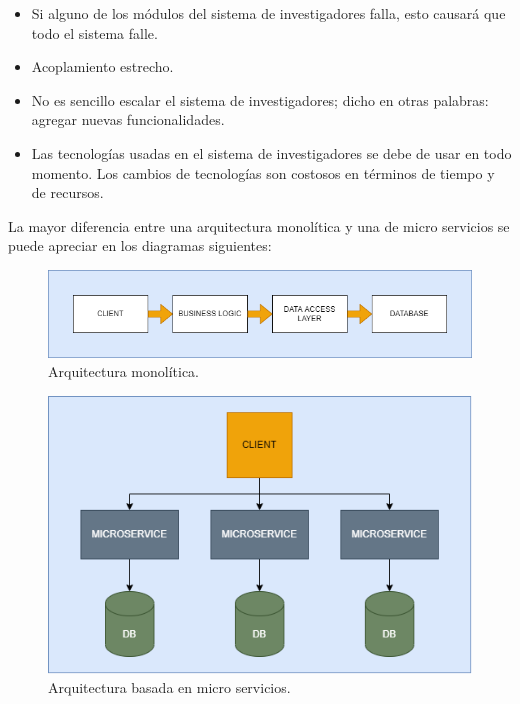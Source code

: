     \begin{itemize}
        \item Si alguno de los módulos del sistema de investigadores falla, esto causará que todo el sistema falle.
        \item Acoplamiento estrecho.
        \item No es sencillo escalar el sistema de investigadores; dicho en otras palabras: agregar nuevas funcionalidades.
        \item Las tecnologías usadas en el sistema de investigadores se debe de usar en todo momento. Los cambios de tecnologías son costosos en términos de tiempo y de recursos.
    \end{itemize}
    
    La mayor diferencia entre una arquitectura monolítica y una de micro servicios se puede apreciar en los diagramas siguientes:
    
    \begin{figure}[H]
        \centering
        \includegraphics[width=\textwidth]{Propuesta_Plantilla_Tesis_LaTeX_UAG/imagenes/monolitico.png}
        \caption{Arquitectura monolítica.\cite{KryptonSolid}}
        \label{fig:monolitica}
    \end{figure}
    
    \begin{figure}[H]
        \centering
        \includegraphics[width=\textwidth]{Propuesta_Plantilla_Tesis_LaTeX_UAG/imagenes/microservicios.png}
        \caption{Arquitectura basada en micro servicios.\cite{KryptonSolid}}
        \label{fig:micro-servicios}
    \end{figure}

